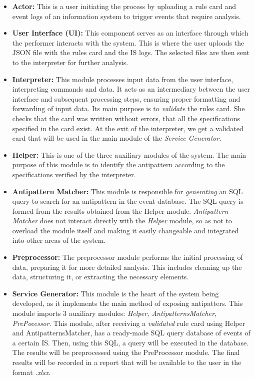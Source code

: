 \documentclass[12pt, times]{article}
\begin{document}
	 \begin{itemize}
	 	\item \textbf{Actor:} This is a user initiating the process by uploading a rule card and event logs of an information system to trigger events that require analysis.
	 	\item \textbf{User Interface (UI):} This component serves as an interface through which the performer interacts with the system. This is where the user uploads the JSON file with the rules card and the IS logs. The selected files are then sent to the interpreter for further analysis.
	 	\item \textbf{Interpreter:} This module processes input data from the user interface, interpreting commands and data. It acts as an intermediary between the user interface and subsequent processing steps, ensuring proper formatting and forwarding of input data. Its main purpose is to \textit{validate} the rules card. She checks that the card was written without errors, that all the specifications specified in the card exist. At the exit of the interpreter, we get a validated card that will be used in the main module of the \textit{Service Generator}.
	 	\item \textbf{Helper:} This is one of the three auxiliary modules of the system. The main purpose of this module is to identify the antipattern according to the specifications verified by the interpreter.
	 	\item \textbf{Antipattern Matcher:} This module is responsible for \textit{generating} an SQL query to search for an antipattern in the event database. The SQL query is formed from the results obtained from the Helper module. \textit{Antipattern Matcher} does not interact directly with the \textit{Helper} module, so as not to overload the module itself and making it easily changeable and integrated into other areas of the system.
	 	\item \textbf{Preprocessor:} The preprocessor module performs the initial processing of data, preparing it for more detailed analysis. This includes cleaning up the data, structuring it, or extracting the necessary elements.
	 	\item \textbf{Service Generator:} This module is the heart of the system being developed, as it implements the main method of exposing antipatters. This module imports 3 auxiliary modules: \textit{Helper, AntipatternsMatcher, PrePocessor}. This module, after receiving a \textit{validated} rule card using Helper and AntipatternsMatcher, has a ready-made SQL query database of events of a certain IS. Then, using this SQL, a query will be executed in the database. The results will be preprocessed using the PreProcessor module. The final results will be recorded in a report that will be available to the user in the format \textit{.xlsx}.

\end{itemize}
\end{document}
